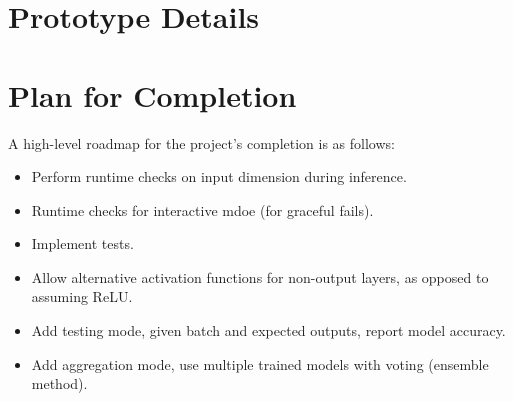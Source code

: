 \documentclass[12pt]{article}
\begin{document}
\section{Prototype Details}


\section{Plan for Completion}
A high-level roadmap for the project's completion is as follows:
\begin{itemize}
	\item Perform runtime checks on input dimension during inference.
	\item Runtime checks for interactive mdoe (for graceful fails).
	\item Implement tests.
	\item Allow alternative activation functions for non-output layers, as opposed to assuming ReLU.
	\item Add testing mode, given batch and expected outputs, report model accuracy.
	\item Add aggregation mode, use multiple trained models with voting (ensemble method).
\end{itemize}
\end{document}
